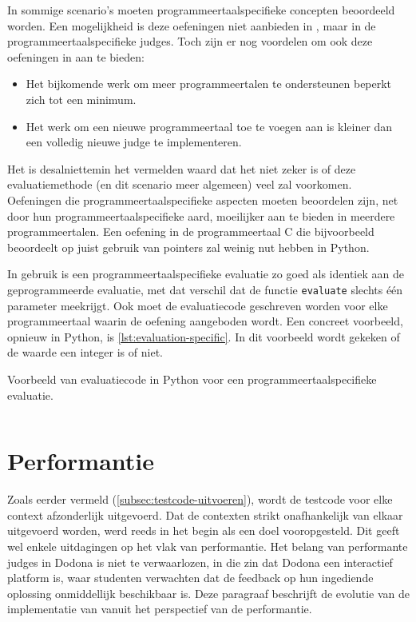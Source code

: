 In sommige scenario's moeten programmeertaalspecifieke concepten beoordeeld worden.
Een mogelijkheid is deze oefeningen niet aanbieden in \tested{}, maar in de programmeertaalspecifieke judges.
Toch zijn er nog voordelen om ook deze oefeningen in \tested{} aan te bieden:
\begin{itemize}
    \item Het bijkomende werk om meer programmeertalen te ondersteunen beperkt zich tot een minimum.
    \item Het werk om een nieuwe programmeertaal toe te voegen aan \tested{} is kleiner dan een volledig nieuwe judge te implementeren.
\end{itemize}
Het is desalniettemin het vermelden waard dat het niet zeker is of deze evaluatiemethode (en dit scenario meer algemeen) veel zal voorkomen.
Oefeningen die programmeertaalspecifieke aspecten moeten beoordelen zijn, net door hun programmeertaalspecifieke aard, moeilijker aan te bieden in meerdere programmeertalen.
Een oefening in de programmeertaal C die bijvoorbeeld beoordeelt op juist gebruik van pointers zal weinig nut hebben in Python.

In gebruik is een programmeertaalspecifieke evaluatie zo goed als identiek aan de geprogrammeerde evaluatie, met dat verschil dat de functie \texttt{evaluate} slechts één parameter meekrijgt.
Ook moet de evaluatiecode geschreven worden voor elke programmeertaal waarin de oefening aangeboden wordt.
Een concreet voorbeeld, opnieuw in Python, is \cref{lst:evaluation-specific}.
In dit voorbeeld wordt gekeken of de waarde een integer is of niet.

\begin{listing}
    \caption{Voorbeeld van evaluatiecode in Python voor een programmeertaalspecifieke evaluatie.}
    \label{lst:evaluation-specific}
    \inputminted{python}{code/evaluator-specific.py}
\end{listing}

\section{Performantie}\label{sec:performantie}

Zoals eerder vermeld (\cref{subsec:testcode-uitvoeren}), wordt de testcode voor elke context afzonderlijk uitgevoerd.
Dat de contexten strikt onafhankelijk van elkaar uitgevoerd worden, werd reeds in het begin als een doel vooropgesteld.
Dit geeft wel enkele uitdagingen op het vlak van performantie.
Het belang van performante judges in Dodona is niet te verwaarlozen, in die zin dat Dodona een interactief platform is, waar studenten verwachten dat de feedback op hun ingediende oplossing onmiddellijk beschikbaar is.
Deze paragraaf beschrijft de evolutie van de implementatie van \tested{} vanuit het perspectief van de performantie.


